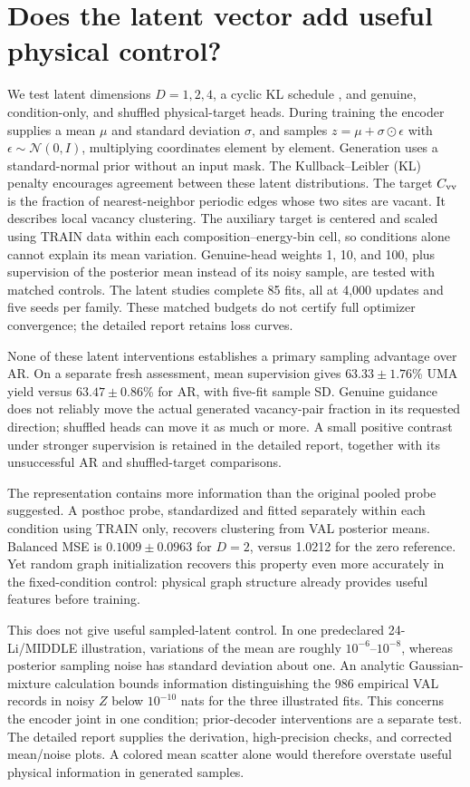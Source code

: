 \documentclass[11pt]{article}
\begin{document}
\section{Does the latent vector add useful physical control?}
We test latent dimensions $D=1,2,4$, a cyclic KL schedule \cite{fu}, and genuine, condition-only,
and shuffled physical-target heads. During training the encoder supplies a
mean $\mu$ and standard deviation $\sigma$, and samples
$z=\mu+\sigma\odot\epsilon$ with $\epsilon\sim\mathcal N(0,I)$, multiplying
coordinates element by element.
Generation uses a standard-normal prior without an input mask. The
Kullback--Leibler (KL) penalty encourages agreement between these latent
distributions. The target $C_{\rm vv}$ is the fraction
of nearest-neighbor periodic edges whose two sites are vacant. It describes
local vacancy clustering. The auxiliary target is centered and scaled using
TRAIN data within each composition--energy-bin cell, so conditions alone
cannot explain its mean variation. Genuine-head weights 1, 10, and 100,
plus supervision of the posterior mean instead of its noisy sample, are
tested with matched controls. The latent studies complete 85 fits, all at
4,000 updates and five seeds per family. These matched budgets do not
certify full optimizer convergence; the detailed report retains loss curves.



None of these latent interventions establishes a primary sampling advantage
over AR. On a separate fresh assessment, mean supervision gives
$63.33\pm1.76$\% UMA yield versus $63.47\pm0.86$\% for AR, with five-fit
sample SD. Genuine guidance does not reliably move the actual generated
vacancy-pair fraction in its requested direction; shuffled heads can move it
as much or more. A small positive contrast under stronger supervision is
retained in the detailed report, together with its unsuccessful AR and
shuffled-target comparisons.

The representation contains more information than the original pooled probe
suggested. A posthoc probe, standardized and fitted separately within each
condition using TRAIN only, recovers clustering from VAL posterior means.
Balanced MSE is $0.1009\pm0.0963$ for $D=2$, versus 1.0212 for the zero
reference. Yet random graph initialization recovers this property even more
accurately in the fixed-condition control: physical graph structure already
provides useful features before training.

This does not give useful sampled-latent control. In one predeclared
24-Li/MIDDLE illustration, variations of the mean are roughly
$10^{-6}$--$10^{-8}$, whereas posterior sampling noise has standard deviation
about one. An analytic Gaussian-mixture calculation bounds information
distinguishing the 986 empirical VAL records in noisy $Z$ below
$10^{-10}$ nats for the three illustrated fits. This concerns the encoder
joint in one condition; prior-decoder interventions are a separate test.
The detailed report supplies the derivation, high-precision checks, and
corrected mean/noise plots. A colored mean scatter alone would therefore
overstate useful physical information in generated samples.
\end{document}
